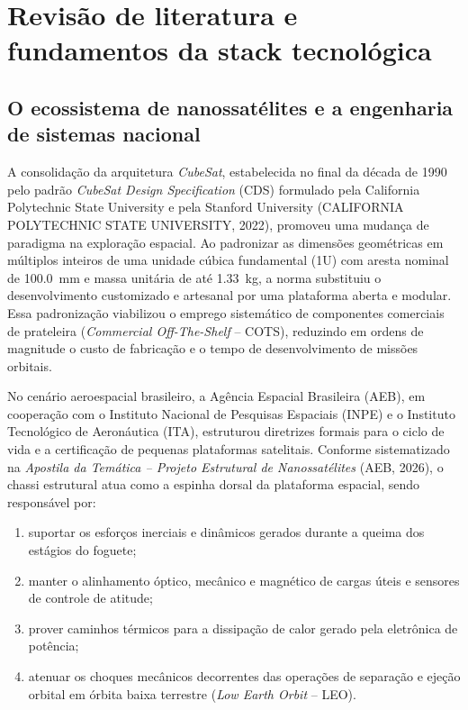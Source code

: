 \chapter{Revisão de literatura e fundamentos da stack tecnológica}
\label{cap:revisao}

\section{O ecossistema de nanossatélites e a engenharia de sistemas nacional}
\label{sec:ecossistema}

A consolidação da arquitetura \textit{CubeSat}, estabelecida no final da década de 1990 pelo padrão \textit{CubeSat Design Specification} (CDS) formulado pela California Polytechnic State University e pela Stanford University (CALIFORNIA POLYTECHNIC STATE UNIVERSITY, 2022), promoveu uma mudança de paradigma na exploração espacial. Ao padronizar as dimensões geométricas em múltiplos inteiros de uma unidade cúbica fundamental (1U) com aresta nominal de \SI{100.0}{\milli\metre} e massa unitária de até \SI{1.33}{\kilo\gram}, a norma substituiu o desenvolvimento customizado e artesanal por uma plataforma aberta e modular. Essa padronização viabilizou o emprego sistemático de componentes comerciais de prateleira (\textit{Commercial Off-The-Shelf} -- COTS), reduzindo em ordens de magnitude o custo de fabricação e o tempo de desenvolvimento de missões orbitais.

No cenário aeroespacial brasileiro, a Agência Espacial Brasileira (AEB), em cooperação com o Instituto Nacional de Pesquisas Espaciais (INPE) e o Instituto Tecnológico de Aeronáutica (ITA), estruturou diretrizes formais para o ciclo de vida e a certificação de pequenas plataformas satelitais. Conforme sistematizado na \textit{Apostila da Temática -- Projeto Estrutural de Nanossatélites} (AEB, 2026), o chassi estrutural atua como a espinha dorsal da plataforma espacial, sendo responsável por:
\begin{enumerate}
  \item suportar os esforços inerciais e dinâmicos gerados durante a queima dos estágios do foguete;
  \item manter o alinhamento óptico, mecânico e magnético de cargas úteis e sensores de controle de atitude;
  \item prover caminhos térmicos para a dissipação de calor gerado pela eletrônica de potência;
  \item atenuar os choques mecânicos decorrentes das operações de separação e ejeção orbital em órbita baixa terrestre (\textit{Low Earth Orbit} -- LEO).
\end{enumerate}

